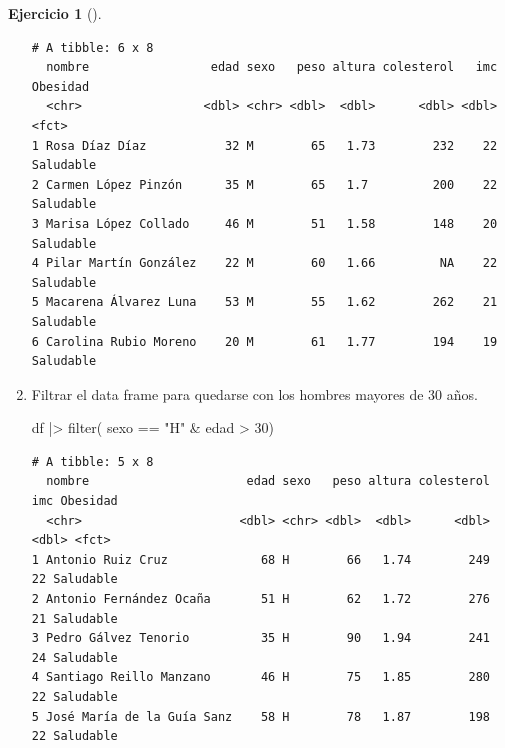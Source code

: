 \documentclass[
  a4paper,
]{scrreport}
\newenvironment{Shaded}{\begin{snugshade}}{\end{snugshade}}
\newcommand{\DecValTok}[1]{\textcolor[rgb]{0.68,0.00,0.00}{#1}}
\newcommand{\FunctionTok}[1]{\textcolor[rgb]{0.28,0.35,0.67}{#1}}
\newcommand{\NormalTok}[1]{\textcolor[rgb]{0.00,0.23,0.31}{#1}}
\newcommand{\SpecialCharTok}[1]{\textcolor[rgb]{0.37,0.37,0.37}{#1}}
\newcommand{\StringTok}[1]{\textcolor[rgb]{0.13,0.47,0.30}{#1}}
\theoremstyle{definition}
\newtheorem{exercise}{Ejercicio}[chapter]
\theoremstyle{remark}
\begin{document}
\begin{exercise}[]
\begin{enumerate}
\begin{tcolorbox}
\begin{verbatim}
# A tibble: 6 x 8
  nombre                 edad sexo   peso altura colesterol   imc Obesidad 
  <chr>                 <dbl> <chr> <dbl>  <dbl>      <dbl> <dbl> <fct>    
1 Rosa Díaz Díaz           32 M        65   1.73        232    22 Saludable
2 Carmen López Pinzón      35 M        65   1.7         200    22 Saludable
3 Marisa López Collado     46 M        51   1.58        148    20 Saludable
4 Pilar Martín González    22 M        60   1.66         NA    22 Saludable
5 Macarena Álvarez Luna    53 M        55   1.62        262    21 Saludable
6 Carolina Rubio Moreno    20 M        61   1.77        194    19 Saludable
\end{verbatim}

  \end{tcolorbox}
\item
  Filtrar el data frame para quedarse con los hombres mayores de 30
  años.

  \begin{tcolorbox}[enhanced jigsaw, coltitle=black, left=2mm, colback=white, leftrule=.75mm, toptitle=1mm, breakable, bottomrule=.15mm, titlerule=0mm, bottomtitle=1mm, title=\textcolor{quarto-callout-tip-color}{\faLightbulb}\hspace{0.5em}{Solución}, arc=.35mm, toprule=.15mm, rightrule=.15mm, colframe=quarto-callout-tip-color-frame, opacityback=0, colbacktitle=quarto-callout-tip-color!10!white, opacitybacktitle=0.6]

\begin{Shaded}
\begin{Highlighting}[]
\NormalTok{df }\SpecialCharTok{|\textgreater{}}
    \FunctionTok{filter}\NormalTok{( sexo }\SpecialCharTok{==} \StringTok{"H"} \SpecialCharTok{\&}\NormalTok{ edad }\SpecialCharTok{\textgreater{}} \DecValTok{30}\NormalTok{)}
\end{Highlighting}
\end{Shaded}

\begin{verbatim}
# A tibble: 5 x 8
  nombre                      edad sexo   peso altura colesterol   imc Obesidad 
  <chr>                      <dbl> <chr> <dbl>  <dbl>      <dbl> <dbl> <fct>    
1 Antonio Ruiz Cruz             68 H        66   1.74        249    22 Saludable
2 Antonio Fernández Ocaña       51 H        62   1.72        276    21 Saludable
3 Pedro Gálvez Tenorio          35 H        90   1.94        241    24 Saludable
4 Santiago Reillo Manzano       46 H        75   1.85        280    22 Saludable
5 José María de la Guía Sanz    58 H        78   1.87        198    22 Saludable
\end{verbatim}


\end{tcolorbox}
\end{enumerate}
\end{exercise}
\end{document}

